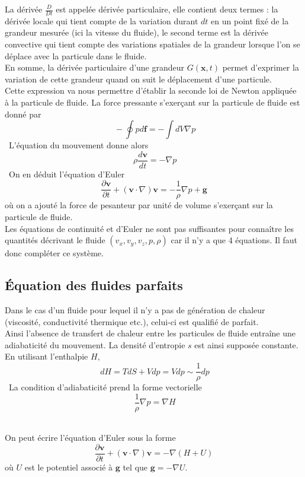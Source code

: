 \documentclass[10pt,a4paper]{book}
\begin{document}
La dérivée $\frac{D}{Dt}$ est appelée dérivée particulaire, elle contient deux termes : la dérivée locale qui tient compte de la variation durant $dt$ en un point fixé de la grandeur mesurée (ici la vitesse du fluide), le second terme est la dérivée convective qui tient compte des variations spatiales de la grandeur lorsque l'on se déplace avec la particule dans le fluide.\\
En somme, la dérivée particulaire d'une grandeur $G(\mathbf{x},t)$ permet d'exprimer la variation de cette grandeur quand on suit le déplacement d'une particule.\\

Cette expression va nous permettre d'établir la seconde loi de Newton appliquée à la particule de fluide. La force pressante s'exerçant sur la particule de fluide est donné par \[\ -\oint pd\mathbf{f}=-\int dV \nabla p \]\ 
L'équation du mouvement donne alors \[\ \rho\frac{d\mathbf{v}}{dt}=-\nabla p \]\
On en déduit l'équation d'Euler 
\begin{equation}
\frac{\partial \mathbf{v}}{\partial t}+(\mathbf{v}\cdot\nabla)\mathbf{v}=-\frac{1}{\rho}\nabla p+\mathbf{g}
\end{equation}
où on a ajouté la force de pesanteur par unité de volume s'exerçant sur la particule de fluide.\\

Les équations de continuité et d'Euler ne sont pas suffisantes pour connaître les quantités décrivant le fluide $(v_x,v_y,v_z,p,\rho)$ car il n'y a que 4 équations. Il faut donc compléter ce système.

\subsection{Équation des fluides parfaits}

Dans le cas d'un fluide pour lequel il n'y a pas de génération de chaleur (viscosité, conductivité thermique etc.), celui-ci est qualifié de parfait.\\
Ainsi l'absence de transfert de chaleur entre les particules de fluide entraîne une adiabaticité du mouvement. La densité d'entropie $s$ est ainsi supposée constante.\\

En utilisant l'enthalpie $H$, \[\ dH=TdS+Vdp = Vdp \sim \frac{1}{\rho}dp\]\ 
La condition d'adiabaticité prend la forme vectorielle \[\ \frac{1}{\rho}\nabla p=\nabla H\]\

On peut écrire l'équation d'Euler sous la forme 
\begin{equation}
\frac{\partial \mathbf{v}}{\partial t}+(\mathbf{v}\cdot\nabla)\mathbf{v}=-\nabla(H+U)
\end{equation}
où $U$ est le potentiel associé à $\mathbf{g}$ tel que $\mathbf{g}=-\nabla U$.
\end{document}

